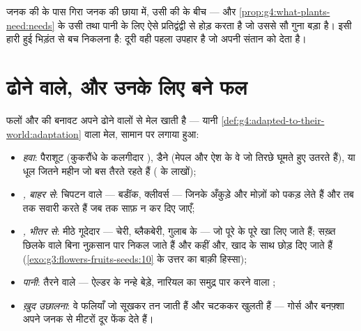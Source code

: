 \begin{example}[घर छोड़ना ही क्यों?]\label{ex:g6:how-plants-spread:whyleave}
जनक की  के पास गिरा  जनक की छाया में, उसी की  के बीच  --- और \cref{prop:g4:what-plants-need:needs} के उसी  तथा
पानी के लिए ऐसे प्रतिद्वंद्वी से होड़ करता है जो उससे सौ गुना बड़ा है।
 इसी हारी हुई भिड़ंत से बच निकलना है: दूरी वही पहला उपहार है
जो  अपनी संतान को देता है।
\end{example}

\section{ढोने वाले, और उनके लिए बने फल}

\begin{proposition}[ढोने वाले के अनुरूप बनावट]\label{prop:g6:how-plants-spread:builds}
फलों और  की बनावट अपने ढोने वालों से मेल खाती है --- यानी
\cref{def:g4:adapted-to-their-world:adaptation} वाला मेल, सामान पर लगाया
हुआ:
\begin{itemize}
  \item \emph{हवा}: पैराशूट (कुकरौंधे के कलगीदार ), डैने (मेपल और
        ऐश के वे  जो तिरछे घूमते हुए उतरते हैं), या धूल जितने महीन
         जो बस तैरते रहते हैं ( के लाखों);
  \item \emph{, बाहर से}: चिपटन वाले  --- बर्डॉक, क्लीवर्स ---
        जिनके अँकुड़े  और मोज़ों को पकड़ लेते हैं और तब तक सवारी
        करते हैं जब तक साफ़ न कर दिए जाएँ;
  \item \emph{, भीतर से}: मीठे गूदेदार  --- चेरी, ब्लैकबेरी,
        गुलाब के  --- जो पूरे के पूरे खा लिए जाते हैं; सख़्त छिलके
        वाले  बिना नुक़सान पार निकल जाते हैं और कहीं और, खाद के साथ
        छोड़ दिए जाते हैं (\cref{exo:g3:flowers-fruits-seeds:10} के
        उत्तर का बाक़ी हिस्सा);
  \item \emph{पानी}: तैरने वाले  --- ऐल्डर के नन्हे बेड़े, नारियल का
        समुद्र पार करने वाला ;
  \item \emph{ख़ुद उछालना}: वे फलियाँ जो सूखकर तन जाती हैं और चटककर
        खुलती हैं --- गोर्स और बनफ़्शा अपने  जनक से मीटरों दूर फेंक
        देते हैं।
\end{itemize}
\end{proposition}
\admitted

